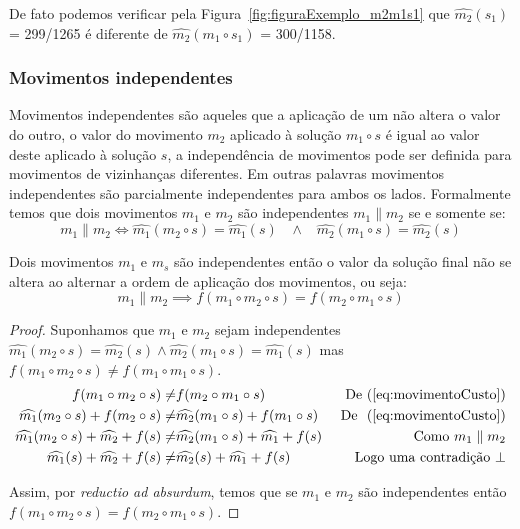 De fato podemos verificar pela Figura~\ref{fig:figuraExemplo_m2m1s1} que $\widehat{m_2}(s_1)$ = 299/1265 é diferente de $\widehat{m_2}(m_1 \circ s_1)$ = 300/1158.

\subsubsection{Movimentos independentes} \label{subsubsec:movimentosIndependentes}

Movimentos independentes são aqueles que a aplicação de um não altera o valor do outro, o valor do movimento $m_2$ aplicado à solução $m_1 \circ s$ é igual ao valor deste aplicado à solução $s$, a independência de movimentos pode ser definida para movimentos de vizinhanças diferentes.
Em outras palavras movimentos independentes são parcialmente independentes para ambos os lados.
Formalmente temos que dois movimentos $m_1$ e $m_2$ são independentes $m_1 \parallel m_2$ se e somente se:
\begin{equation}
m_1 \parallel m_2 \iff \widehat{m_1}(m_2 \circ s) = \widehat{m_1}(s) \;\;\; \land \;\;\; \widehat{m_2}(m_1 \circ s) = \widehat{m_2}(s)
\end{equation}

\begin{theorem}%
Dois movimentos $m_1$ e $m_s$ são independentes então o valor da solução final não se altera ao alternar a ordem de aplicação dos movimentos, ou seja:
\begin{equation}
m_1 \parallel m_2 \implies f(m_1 \circ m_2 \circ s) = f(m_2 \circ m_1 \circ s)
\end{equation}

\begin{proof}
    Suponhamos que $m_1$ e $m_2$ sejam independentes $\widehat{m_1}(m_2 \circ s) = \widehat{m_2}(s) \land \widehat{m_2}(m_1 \circ s) = \widehat{m_1}(s)$ mas $f(m_1 \circ m_2 \circ s) \neq f(m_1 \circ m_1 \circ s)$.
    \begin{align*}
        f(m_1 \circ m_2 \circ s) \neq & f(m_2 \circ m_1 \circ s) & \textrm{ De }(\ref{eq:movimentoCusto}) \\
        \widehat{m_1}(m_2 \circ s) + f(m_2 \circ s) \neq & \widehat{m_2}(m_1 \circ s) + f(m_1 \circ s) & \textrm{ De }\ (\ref{eq:movimentoCusto}) \\
        \widehat{m_1}(m_2 \circ s) + \widehat{m_2} + f(s) \neq & \widehat{m_2}(m_1 \circ s) + \widehat{m_1} + f(s) & \textrm{ Como } m_1 \parallel m_2 \\
        \widehat{m_1}(s) + \widehat{m_2} + f(s) \neq & \widehat{m_2}(s) + \widehat{m_1} + f(s) & \textrm{ Logo uma contradição } \bot
    \end{align*}
    
    Assim, por \textit{reductio ad absurdum}, temos que se $m_1$ e $m_2$ são independentes então $f(m_1 \circ m_2 \circ s) = f(m_2 \circ m_1 \circ s)$.
\end{proof}
\end{theorem}

